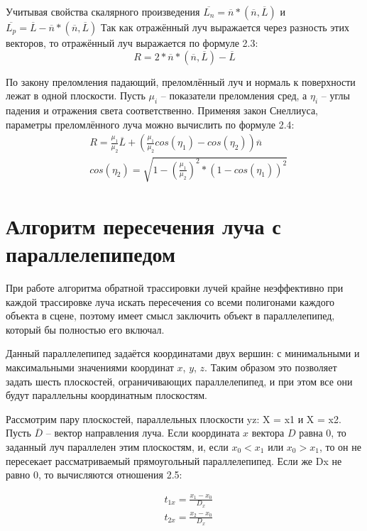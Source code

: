 Учитывая свойства скалярного произведения $ \overline{L_n} = \overline{n} * (\overline{n}, \overline{L}) $ и  $ \overline{L_p} = \overline{L} - \overline{n} * (\overline{n}, \overline{L}) $
Так как отражённый луч выражается через разность этих векторов, то отражённый луч выражается по формуле 2.3:
\begin{equation}
R = 2*\overline{n}*(\overline{n}, \overline{L}) - \overline{L}
\end{equation}

По закону преломления падающий, преломлённый луч и нормаль к поверхности лежат в одной плоскости. 
Пусть $ \mu_i$ -- показатели преломления сред, а $\eta_i$ – углы падения и отражения света соответственно. 
Применяя закон Снеллиуса, параметры преломлённого луча можно вычислить по формуле 2.4:
\begin{equation}
\begin{aligned}
& R = \frac{\mu_1}{\mu_2} \overline{L} + ( \frac{\mu_1}{\mu_2} cos(\eta_1) - cos(\eta_2))\overline{n} \\ 
& cos(\eta_2) = \sqrt{1 - (\frac{\mu_1}{\mu_2})^2 * (1 - cos(\eta_1))^2}
\end{aligned}
\end{equation} 

\section{Алгоритм пересечения луча с параллелепипедом}
При работе алгоритма обратной трассировки лучей крайне неэффективно при каждой трассировке луча искать пересечения со всеми полигонами каждого объекта в сцене, поэтому имеет смысл заключить объект в параллелепипед, который бы полностью его включал.

Данный параллелепипед задаётся координатами двух вершин: с минимальными и максимальными значениями координат $ x $, $ y $, $ z $. Таким образом это позволяет задать шесть плоскостей, ограничивающих параллелепипед, и при этом все они будут параллельны координатным плоскостям.

Рассмотрим пару плоскостей, параллельных плоскости yz: X = x1 и X = x2. Пусть $ \overline{D} $ -- вектор направления луча. Если координата $ x $ вектора $ D $ равна 0, то заданный луч параллелен этим плоскостям, и, если $ x_0 < x_1 $ или $ x_0 > x_1 $, то он не пересекает рассматриваемый прямоугольный параллелепипед. Если же Dx не равно 0, то вычисляются отношения 2.5: 

\begin{equation}
\begin{aligned}
& t_{1x} = \frac{x_1 - x_0}{D_x} \\ 
& t_{2x} = \frac{x_2 - x_0}{D_x} \\
\end{aligned}
\end{equation} 

